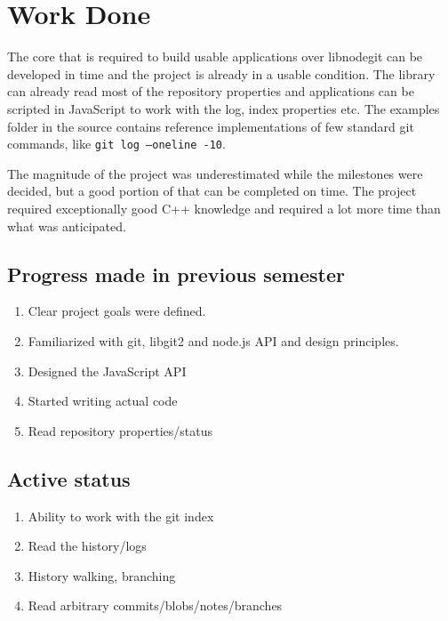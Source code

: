 \chapter{Work Done}

The core that is required to build usable applications over libnodegit can be
developed in time and the project is already in a usable condition. The library
can already read most of the repository properties and applications can be
scripted in JavaScript to work with the log, index properties etc. The examples
folder in the source contains reference implementations of few standard git
commands, like \texttt{git log --oneline -10}.

The magnitude of the project was underestimated while the milestones were
decided, but a good portion of that can be completed on time. The project
required exceptionally good C++ knowledge and required a lot more time than what
was anticipated.

\section{Progress made in previous semester}

\begin{enumerate}

\item Clear project goals were defined.
\item Familiarized with git, libgit2 and node.js API and design principles.
\item Designed the JavaScript API
\item Started writing actual code
\item Read repository properties/status

\end{enumerate}

\section{Active status}

\begin{enumerate}

	\item Ability to work with the git index
    \item Read the history/logs
    \item History walking, branching
    \item Read arbitrary commits/blobs/notes/branches

\end{enumerate}


